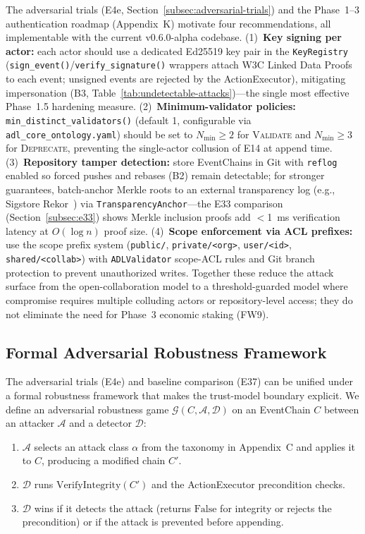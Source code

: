 The adversarial trials (E4e, Section~\ref{subsec:adversarial-trials}) and the Phase~1--3 authentication roadmap (Appendix~K) motivate four recommendations, all implementable with the current v0.6.0-alpha codebase. (1)~\textbf{Key signing per actor:} each actor should use a dedicated Ed25519 key pair in the \texttt{KeyRegistry} (\texttt{sign\_event()}/\texttt{verify\_signature()} wrappers attach W3C Linked Data Proofs to each event; unsigned events are rejected by the ActionExecutor), mitigating impersonation (B3, Table~\ref{tab:undetectable-attacks})---the single most effective Phase~1.5 hardening measure. (2)~\textbf{Minimum-validator policies:} \texttt{min\_distinct\_validators()} (default 1, configurable via \texttt{adl\_core\_ontology.yaml}) should be set to $N_{\min} \geq 2$ for \textsc{Validate} and $N_{\min} \geq 3$ for \textsc{Deprecate}, preventing the single-actor collusion of E14 at append time. (3)~\textbf{Repository tamper detection:} store EventChains in Git with \texttt{reflog} enabled so forced pushes and rebases (B2) remain detectable; for stronger guarantees, batch-anchor Merkle roots to an external transparency log (e.g., Sigstore Rekor~\cite{sigstore2022}) via \texttt{TransparencyAnchor}---the E33 comparison (Section~\ref{subsec:e33}) shows Merkle inclusion proofs add $<$1~ms verification latency at $O(\log n)$ proof size. (4)~\textbf{Scope enforcement via ACL prefixes:} use the scope prefix system (\texttt{public/}, \texttt{private/<org>}, \texttt{user/<id>}, \texttt{shared/<collab>}) with \texttt{ADLValidator} scope-ACL rules and Git branch protection to prevent unauthorized writes. Together these reduce the attack surface from the open-collaboration model to a threshold-guarded model where compromise requires multiple colluding actors or repository-level access; they do not eliminate the need for Phase~3 economic staking (FW9).

\subsection{Formal Adversarial Robustness Framework}\label{subsec:adversarial-framework}

The adversarial trials (E4e) and baseline comparison (E37) can be unified under a formal robustness framework that makes the trust-model boundary explicit. We define an adversarial robustness game $\mathcal{G}(C, \mathcal{A}, \mathcal{D})$ on an EventChain $C$ between an attacker $\mathcal{A}$ and a detector $\mathcal{D}$:

\begin{enumerate}[label=(\arabic*)]
    \item $\mathcal{A}$ selects an attack class $\alpha$ from the taxonomy in Appendix~C and applies it to $C$, producing a modified chain $C'$.
    \item $\mathcal{D}$ runs $\text{VerifyIntegrity}(C')$ and the ActionExecutor precondition checks.
    \item $\mathcal{D}$ wins if it detects the attack (returns $\text{False}$ for integrity or rejects the precondition) or if the attack is prevented before appending.
\end{enumerate}

